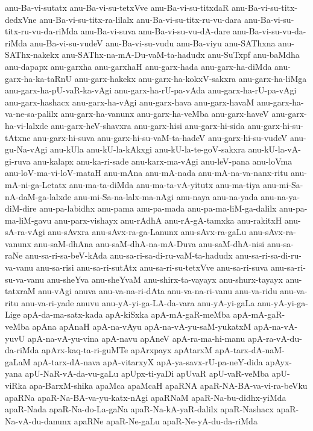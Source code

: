 {anu-Ba-vi-sutatx
anu-Ba-vi-su-tetxVve
anu-Ba-vi-su-titxdaR
anu-Ba-vi-su-titx-dedxVne
anu-Ba-vi-su-titx-ra-lilalx
anu-Ba-vi-su-titx-ru-vu-dara
anu-Ba-vi-su-titx-ru-vu-da-riMda
anu-Ba-vi-suva
anu-Ba-vi-su-vu-dA-dare
anu-Ba-vi-su-vu-da-riMda
anu-Ba-vi-su-vudeV
anu-Ba-vi-su-vudu
anu-Ba-viyu
anu-SAThxna
anu-SAThx-nakekx
anu-SAThx-na-mA-Du-vaM-ta-hadudx
anu-SuTxpf
anu-baMdha
anu-dapapx
anu-garxha
anu-garxhaH
anu-garx-hada
anu-garx-ha-diMda
anu-garx-ha-ka-taRnU
anu-garx-hakekx
anu-garx-ha-kokxV-sakxra
anu-garx-ha-liMga
anu-garx-ha-pU-vaR-ka-vAgi
anu-garx-ha-rU-pa-vAda
anu-garx-ha-rU-pa-vAgi
anu-garx-hashacx
anu-garx-ha-vAgi
anu-garx-hava
anu-garx-havaM
anu-garx-ha-va-ne-sa-palilx
anu-garx-ha-vanunx
anu-garx-ha-veMba
anu-garx-haveV
anu-garx-ha-vi-lalxde
anu-garx-heV-shavxra
anu-garx-hisi
anu-garx-hi-sida
anu-garx-hi-su-tAtxne
anu-garx-hi-suva
anu-garx-hi-su-vaM-ta-hadeV
anu-garx-hi-su-vudeV
anu-gu-Na-vAgi
anu-kUla
anu-kU-la-kAkxgi
anu-kU-la-te-goV-sakxra
anu-kU-la-vA-gi-ruva
anu-kalapx
anu-ka-ri-sade
anu-karx-ma-vAgi
anu-leV-pana
anu-loVma
anu-loV-ma-vi-loV-mataH
anu-mAna
anu-mA-nada
anu-mA-na-va-nanx-ritu
anu-mA-ni-ga-Letatx
anu-ma-ta-diMda
anu-ma-ta-vA-yitutx
anu-ma-tiya
anu-mi-Sa-nA-daM-ga-lalxde
anu-mi-Sa-na-lalx-ma-nAgi
anu-naya
anu-na-yada
anu-na-ya-diM-dire
anu-pa-labidhx
anu-pama
anu-pa-mada
anu-pa-ma-liM-ga-dalilx
anu-pa-ma-liM-gavu
anu-parx-vishayx
anu-rAdhA
anu-rA-gA-tamxka
anu-rakitxH
anu-sA-ra-vAgi
anu-sAvxra
anu-sAvx-ra-ga-Lanunx
anu-sAvx-ra-gaLu
anu-sAvx-ra-vanunx
anu-saM-dhAna
anu-saM-dhA-na-mA-Duva
anu-saM-dhA-nisi
anu-sa-raNe
anu-sa-ri-sa-beV-kAda
anu-sa-ri-sa-di-ru-vaM-ta-hadudx
anu-sa-ri-sa-di-ru-va-vanu
anu-sa-risi
anu-sa-ri-sutAtx
anu-sa-ri-su-tetxVve
anu-sa-ri-suva
anu-sa-ri-su-va-vanu
anu-sheYva
anu-sheYvaM
anu-shirx-ta-vayayx
anu-shurx-tayayx
anu-tatxraM
anu-vAgi
anuva
anu-va-na-ri-dAta
anu-va-na-ri-vanu
anu-va-ridu
anu-va-ritu
anu-va-ri-yade
anuvu
anu-yA-yi-ga-LA-da-vara
anu-yA-yi-gaLa
anu-yA-yi-ga-Lige
apA-da-ma-satx-kada
apA-kiSxka
apA-mA-gaR-meMba
apA-mA-gaR-veMba
apAna
apAnaH
apA-na-vAyu
apA-na-vA-yu-saM-yukatxM
apA-na-vA-yuvU
apA-na-vA-yu-vina
apA-navu
apAneV
apA-ra-ma-hi-manu
apA-ra-vA-du-da-riMda
apArx-kaq-ta-ri-guMTe
apArxpayx
apAtarxM
apA-tarx-dA-naM-gaLaM
apA-tarx-dA-nava
apA-vitarxyX
apA-ya-savx-rU-pa-neY-dida
apAyx-yana
apU-NaR-vA-da-vu-gaLu
apUpx-ti-yaDi
apUvaR
apU-vaR-veMba
apU-viRka
apa-BarxM-shika
apaMca
apaMcaH
apaRNA
apaR-NA-BA-va-vi-ra-beVku
apaRNa
apaR-Na-BA-va-yu-katx-nAgi
apaRNaM
apaR-Na-bu-didhx-yiMda
apaR-Nada
apaR-Na-do-La-gaNa
apaR-Na-kA-yaR-dalilx
apaR-Nashacx
apaR-Na-vA-du-danunx
apaRNe
apaR-Ne-gaLu
apaR-Ne-yA-du-da-riMda
}
